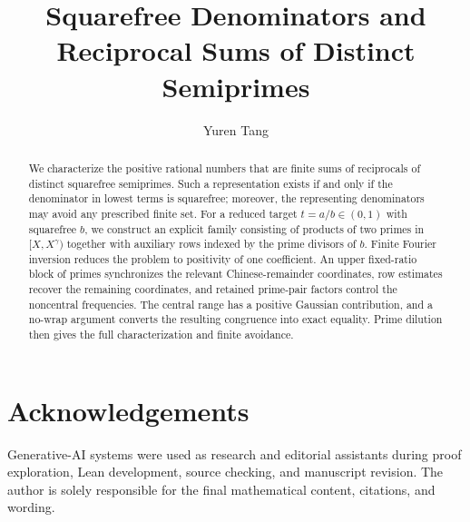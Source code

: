 \documentclass[11pt,a4paper,reqno]{amsart}
\title{Squarefree Denominators and Reciprocal Sums of Distinct Semiprimes}
\author{Yuren Tang}
\date{}
\numberwithin{equation}{section}
\theoremstyle{definition}
\theoremstyle{remark}
\begin{document}
\begin{abstract}
We characterize the positive rational numbers that are finite sums of reciprocals of distinct squarefree semiprimes. Such a representation exists if and only if the denominator in lowest terms is squarefree; moreover, the representing denominators may avoid any prescribed finite set. For a reduced target $t=a/b\in(0,1)$ with squarefree $b$, we construct an explicit family consisting of products of two primes in $[X,X^\gamma)$ together with auxiliary rows indexed by the prime divisors of $b$. Finite Fourier inversion reduces the problem to positivity of one coefficient. An upper fixed-ratio block of primes synchronizes the relevant Chinese-remainder coordinates, row estimates recover the remaining coordinates, and retained prime-pair factors control the noncentral frequencies. The central range has a positive Gaussian contribution, and a no-wrap argument converts the resulting congruence into exact equality. Prime dilution then gives the full characterization and finite avoidance.
\end{abstract}
\maketitle









\section*{Acknowledgements}
Generative-AI systems were used as research and editorial assistants during proof exploration, Lean development, source checking, and manuscript revision. The author is solely responsible for the final mathematical content, citations, and wording.

\printbibliography
\thispagestyle{plain}
\end{document}
